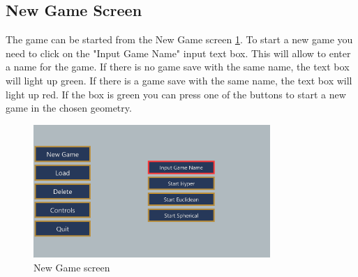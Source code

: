 \subsection{New Game Screen}
The game can be started from the New Game screen \ref{fig:new_game}.
To start a new game you need to click on the "Input Game Name" input text box.
This will allow to enter a name for the game.
If there is no game save with the same name, the text box will light up green.
If there is a game save with the same name, the text box will light up red.
If the box is green you can press one of the buttons to start a new game in the chosen geometry.

\begin{figure}[H]
    \centering
    \includegraphics[width=0.8\textwidth]{sections/user_manual/resources/new-game-no-input.png}
    \caption{New Game screen}
    \label{fig:new_game}
\end{figure}